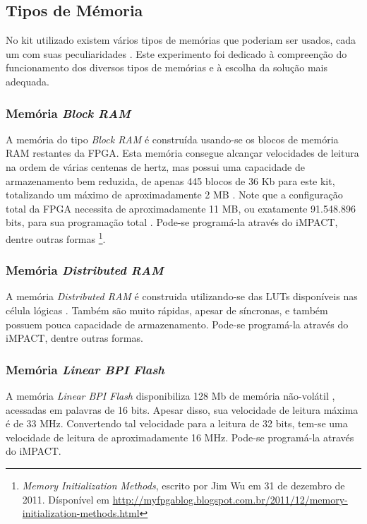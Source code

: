 \documentclass[11pt,a4paper,oneside]{book}
\begin{document}
\subsection{Tipos de Mémoria}
No kit utilizado existem vários tipos de memórias que poderiam ser usados, cada um com suas peculiaridades \cite{ug810}.
Este experimento foi dedicado à compreenção do funcionamento dos diversos tipos de memórias e à escolha da solução mais adequada.

\subsubsection{Memória \textit{Block RAM}}
A memória do tipo \textit{Block RAM} é construída usando-se os blocos de memória RAM restantes da FPGA.
Esta memória consegue alcançar velocidades de leitura na ordem de várias centenas de hertz, mas possui uma capacidade de armazenamento bem reduzida, de apenas 445 blocos de 36 Kb para este kit, totalizando um máximo de aproximadamente 2 MB \cite{ug473, wp377}.
Note que a configuração total da FPGA necessita de aproximadamente 11 MB, ou exatamente 91.548.896 bits, para sua programação total \cite{ug470}.
Pode-se programá-la através do iMPACT, dentre outras formas \footnote{\textit{Memory Initialization Methods}, escrito por Jim Wu em 31 de dezembro de 2011. Dísponível em \url{http://myfpgablog.blogspot.com.br/2011/12/memory-initialization-methods.html}}.

\subsubsection{Memória \textit{Distributed RAM}}
A memória \textit{Distributed RAM} é construida utilizando-se das LUTs disponíveis nas célula lógicas \cite{ug473, wp377}.
Também são muito rápidas, apesar de síncronas, e também possuem pouca capacidade de armazenamento.
Pode-se programá-la através do iMPACT, dentre outras formas.

\subsubsection{Memória \textit{Linear BPI Flash}}
A memória \textit{Linear BPI Flash} disponibiliza 128 Mb de memória não-volátil \cite{ug810}, acessadas em palavras de 16 bits.
Apesar disso, sua velocidade de leitura máxima é de 33 MHz.
Convertendo tal velocidade para a leitura de 32 bits, tem-se uma velocidade de leitura de aproximadamente 16 MHz.
Pode-se programá-la através do iMPACT.
\end{document}

